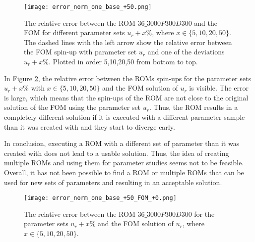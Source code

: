 \begin{figure}[ht]
\centering
  \texttt{[image: error\_norm\_one\_base\_+50.png]}
  \caption[The relative error between the ROM $36\_3000P300D300$ and the FOM for different sets of parameters.]{The relative error between the ROM $36\_3000P300D300$ and the FOM for different parameter sets $u_r + x\%$, where $x\in \{5, 10, 20, 50\}$. The dashed lines with the left arrow show the relative error between 
  the FOM spin-up with parameter set $u_r$ and one of the deviations $u_r + x\%$. Plotted in order 5,10,20,50 from bottom to top.}
  \label{fig:error_norm_one_base_+50}
\end{figure}

In Figure \ref{fig:error_norm_one_base_+50_FOM_+0}, the relative error between the ROMs spin-ups for the parameter sets $u_r + x\%$ with $x \in  \{5,10,20,50\}$ and the FOM solution of $u_r$ is visible. The error is
large, which means that the spin-ups of the ROM are not close to the original solution of the FOM using the parameter set $u_r$. Thus, the ROM results in a completely different solution if it is executed with a different parameter sample than it was created with and they start to diverge early. 

In conclusion, executing a ROM with a different set of parameter than it was created with does not lead to a usable solution. Thus, the idea of creating multiple ROMs and using them for parameter studies seems not to be feasible. Overall, it has not been possible to find a ROM or multiple ROMs that can be used for new sets of parameters and resulting in an acceptable solution.
\begin{figure}[ht]
\centering
  \texttt{[image: error\_norm\_one\_base\_+50\_FOM\_+0.png]}
  \caption[The relative error between the ROM $36\_3000P300D300$ and the FOM solution of $u_r$.]{The relative error between the ROM $36\_3000P300D300$ for the parameter sets $u_r + x\%$  and the FOM solution of $u_r$, where $x\in \{5,10,20,50\}$.}
  \label{fig:error_norm_one_base_+50_FOM_+0}
\end{figure}
